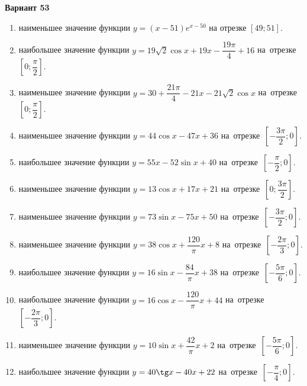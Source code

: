 \documentclass[a4paper,10pt]{article}
\begin{document}
\begin{center}\Large\textbf{Вариант 53}\end{center}

\begin{enumerate}
\item {} наименьшее значение функции $y = \left(x-51\right)e^{x-50}$ на отрезке $\left[49;51\right]$.

\item {} наибольшее значение функции $y = 19\sqrt{2}\cos x+19x-\dfrac{19\pi}{4} +16$ на~отрезке~$\left[0;\dfrac{\pi }{2}\right]$.

\item {} наименьшее значение функции $y = 30+\dfrac{21 \pi}{4}-21x-21\sqrt{2}\cos x$ на~отрезке~$\left[0;\dfrac{\pi }{2}\right]$.

\item {} наименьшее значение функции $y = 44\cos x-47x+36$ на~отрезке~$\left[-\dfrac{3\pi }{2};0\right]$.

\item {} наибольшее значение функции $y = 55x-52\sin x+40$ на~отрезке~$\left[-\dfrac{\pi }{2};0\right]$.

\item {} наименьшее значение функции $y = 13\cos x+17x+21$ на~отрезке~$\left[0;\dfrac{3\pi }{2}\right]$.

\item {} наименьшее значение функции $y = 73\sin x-75x+50$ на~отрезке~$\left[-\dfrac{3\pi }{2};0\right]$.

\item {} наименьшее значение функции $y = 38\cos x+\dfrac{120}{\pi }x +8$ на~отрезке~$\left[-\dfrac{2\pi }{3};0\right]$.

\item {} наибольшее значение функции $y = 16\sin x-\dfrac{84}{\pi }x+38$ на~отрезке~$\left[-\dfrac{5\pi }{6};0\right]$.

\item {} наибольшее значение функции $y = 16\cos x-\dfrac{120}{\pi }x+44$ на~отрезке~$\left[-\dfrac{2\pi }{3};0\right]$.

\item {} наименьшее значение функции $y = 10\sin x+\dfrac{42}{\pi }x+2$ на~отрезке~$\left[-\dfrac{5\pi }{6};0\right]$.

\item {} наибольшее значение функции $y = 40\tg x-40x+22$ на~отрезке~$\left[-\dfrac{\pi }{4};0\right]$.


\end{enumerate}
\end{document}
